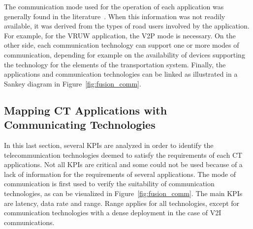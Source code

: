 The communication mode used for the operation of each application was generally found in the literature~\cite{hobert_enhancements_2015}. When this information was not readily available, it was derived from the types of road users involved by the application. 
For example, for the \acrfull{VRUW} application, the \acrshort{V2P} mode is necessary. %
On the other side, each communication technology can support one or more modes of communication, depending for example on the availability of devices supporting the technology for the elements of the transportation system. Finally, the applications and communication technologies can be linked as illustrated in a Sankey diagram in Figure~\ref{fig:fusion_comm}. 


\subsection{Mapping CT Applications with Communicating Technologies}

In this last section, several \acrshort{KPI}s are analyzed in order to identify the telecommunication technologies deemed to satisfy the requirements of each \acrshort{CT} applications. Not all \acrshort{KPI}s are critical and some could not be used because of a lack of information for the requirements of several applications. The mode of communication is first used to verify the suitability of communication technologies, as can be visualized in Figure~\ref{fig:fusion_comm}.  
The main \acrshort{KPI}s are latency, data rate and range. Range applies for all technologies, except for communication technologies with a dense deployment in the case of V2I communications.


